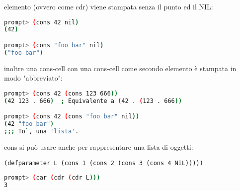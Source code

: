 \documentclass[a4paper,12pt, oneside]{book}
\begin{document}
elemento (ovvero come cdr) viene stampata senza il punto ed il NIL:
\begin{shaded}
\begin{lstlisting}[language=bash]
prompt> (cons 42 nil)
(42)

prompt> (cons "foo bar" nil)
("foo bar")
\end{lstlisting}
\end{shaded}
inoltre una cons-cell con una cons-cell come secondo elemento è stampata in modo "abbreviato":
\begin{shaded}
\begin{lstlisting}[language=bash]
prompt> (cons 42 (cons 123 666))
(42 123 . 666)  ; Equivalente a (42 . (123 . 666))

prompt> (cons 42 (cons "foo bar" nil))
(42 "foo bar")
;;; To`, una 'lista'.
\end{lstlisting}
\end{shaded}
cons si può usare anche per rappresentare una lista di oggetti:
\begin{verbatim}
(defparameter L (cons 1 (cons 2 (cons 3 (cons 4 NIL)))))
\end{verbatim}
\begin{shaded}
\begin{lstlisting}[language=bash]
prompt> (car (cdr (cdr L)))
3
\end{lstlisting}
\end{shaded}
\end{document}
